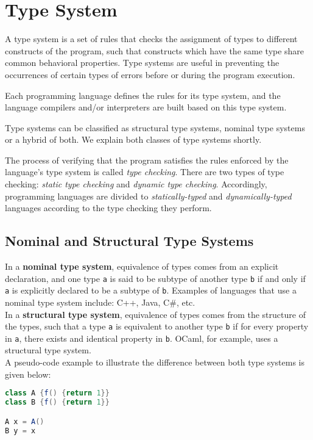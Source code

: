 \section{Type System}
A type system is a set of rules that checks the assignment of types to different constructs of the program, such that constructs which have the same type share common behavioral properties. Type systems are useful in preventing the occurrences of certain types of errors before or during the program execution.

Each programming language defines the rules for its type system, and the language compilers and/or interpreters are built based on this type system.

Type systems can be classified as structural type systems, nominal type systems or a hybrid of both. We explain both classes of type systems shortly.

The process of verifying that the program satisfies the rules enforced by the language's type system is called \textit{type checking}. There are two types of type checking: \textit{static type checking} and \textit{dynamic type checking}. Accordingly, programming languages are divided to \textit{statically-typed} and \textit{dynamically-typed} languages according to the type checking they perform.

\subsection{Nominal and Structural Type Systems}
In a \textbf{nominal type system}, equivalence of types comes from an explicit declaration, and one type \lstinline|a| is said to be subtype of another type \lstinline|b| if and only if \lstinline|a| is explicitly declared to be a subtype of \lstinline|b|. Examples of languages that use a nominal type system include: C++, Java, C\#, etc.\\

In a \textbf{structural type system}, equivalence of types comes from the structure of the types, such that a type \lstinline|a| is equivalent to another type \lstinline|b| if for every property in \lstinline|a|, there exists and identical property in \lstinline|b|. OCaml, for example, uses a structural type system. \\

A pseudo-code example to illustrate the difference between both type systems is given below:
\begin{lstlisting}[language=java]
class A {f() {return 1}}
class B {f() {return 1}}

A x = A()
B y = x
\end{lstlisting}

